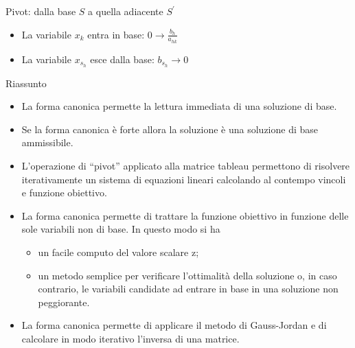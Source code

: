 \documentclass{beamer}
\begin{document}
\begin{frame}[allowframebreaks]{Pivot: dalla base $S$ a quella adiacente $S^\prime$ }
\begin{itemize}
\item La variabile $x_k$ entra in base:
$0 \to \frac{b_h}{a_{hk}}$

\item La variabile $x_{s_h}$ esce dalla base: $b_{s_h} \to 0$
\end{itemize}  
 
\end{frame}

\begin{frame}[allowframebreaks]{Riassunto}

\begin{itemize}
\item La forma canonica permette la lettura immediata di una
soluzione di base.

\item Se la forma canonica \`e forte allora la soluzione \`e una
soluzione di base ammissibile.

\item L'operazione di ``pivot'' applicato alla matrice tableau
permettono di risolvere iterativamente un sistema di
equazioni lineari calcolando al contempo vincoli e
funzione obiettivo.

\item La forma canonica permette di trattare la funzione
obiettivo in funzione delle sole variabili non di base.
In questo modo si ha

\begin{itemize}
\item un facile computo del valore scalare z;

\item un metodo semplice per verificare l'ottimalit\`a
della soluzione o, in caso contrario, le variabili candidate
ad entrare in base in una soluzione non peggiorante.
\end{itemize}

\item La forma canonica permette di applicare il metodo di
Gauss-Jordan e di calcolare in modo iterativo l'inversa
di una matrice.
\end{itemize}
\end{frame}
\end{document}
